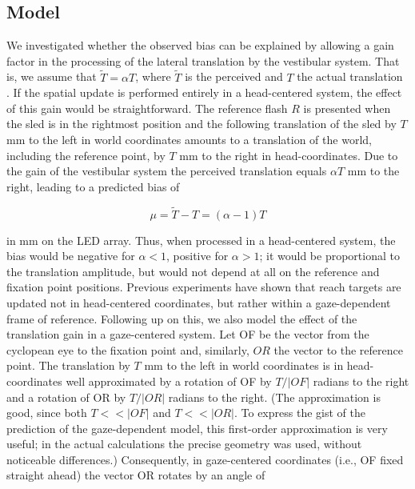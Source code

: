 \subsection{Model}
\label{p2:sec:model}

We investigated whether the observed bias can be explained by allowing a gain factor in the processing of the lateral translation by the vestibular system. That is, we assume that $\tilde{T} = {\alpha}T$, where $\tilde{T}$ is the perceived and $T$ the actual translation \cite{medendorp1999}. If the spatial update is performed entirely in a head-centered system, the effect of this gain would be straightforward. The reference flash $R$ is presented when the sled is in the rightmost position and the following translation of the sled by $T$ mm to the left in world coordinates amounts to a translation of the world, including the reference point, by $T$ mm to the right in head-coordinates. Due to the gain of the vestibular system the perceived translation equals ${\alpha}T$ mm to the right, leading to a predicted bias of

\begin{equation}
\label{p2:eq2}
\mu = \tilde{T} - T = (\alpha - 1) T
\end{equation}

in mm on the LED array. Thus, when processed in a head-centered system, the bias would be negative for $\alpha < 1$, positive for $\alpha > 1$; it would be proportional to the translation amplitude, but would not depend at all on the reference and fixation point positions.
Previous experiments \cite{vanpelt2007} have shown that reach targets are updated not in head-centered coordinates, but rather within a gaze-dependent frame of reference. Following up on this, we also model the effect of the translation gain in a gaze-centered system. Let OF be the vector from the cyclopean eye to the fixation point and, similarly, $OR$ the vector to the reference point. The translation by $T$ mm to the left in world coordinates is in head-coordinates well approximated by a rotation of OF by $T/|OF|$ radians to the right and a rotation of OR by $T/|OR|$ radians to the right. (The approximation is good, since both $T<<|OF|$ and $T<<|OR|$. To express the gist of the prediction of the gaze-dependent model, this first-order approximation is very useful; in the actual calculations the precise geometry was used, without noticeable differences.)  Consequently, in gaze-centered coordinates (i.e., OF fixed straight ahead) the vector OR rotates by an angle of 

